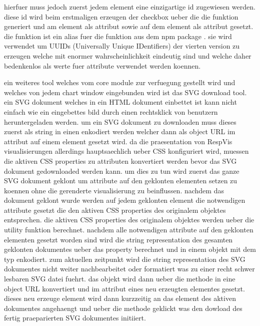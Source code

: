 hierfuer muss jedoch zuerst jedem  element eine einzigartige id zugewiesen werden.
diese id wird beim erstmaligen erzeugen der checkbox ueber die die  funktion generiert und am  element als  attribut sowie auf dem  element als  attribut gesetzt.
die  funktion ist ein alias fuer die  funktion aus dem  npm package \parencite{UUIDPackage}.
sie wird verwendet um UUIDs (Universally Unique IDentifiers) \parencite{UUIDRFC} der vierten version zu erzeugen welche mit enormer wahrscheinlichkeit eindeutig sind und welche daher bedenkenlos als werte fuer  attribute verwendet werden koennen.

ein weiteres tool welches vom core module zur verfuegung gestellt wird und welches von jedem chart window eingebunden wird ist das SVG download tool.
ein SVG dokument welches in ein HTML dokument einbettet ist kann nicht einfach wie ein eingebettes bild durch einen rechtsklick von benutzern heruntergeladen werden.
um ein SVG dokument zu downloaden muss dieses zuerst als string in einen  enkodiert werden welcher dann als object URL im  attribut auf einem  element gesetzt wird.
da die praesentation von RespVis visualisierungen allerdings hauptsaechlich ueber CSS konfiguriert wird, muessen die aktiven CSS properties zu attributen konvertiert werden bevor das SVG dokument gedownloaded werden kann.
um dies zu tun wird zuerst das ganze SVG dokument geklont um attribute auf den geklonten elementen setzen zu koennen ohne die gerenderte visualisierung zu beinflussen.
nachdem das dokument geklont wurde werden auf jedem geklonten element die notwendigen attribute gesetzt die den aktiven CSS properties des originalem objektes entsprechen.
die aktiven CSS properties des originalem objektes werden ueber die  utility funktion berechnet.
nachdem alle notwendigen attribute auf den geklonten elementen gesetzt worden sind wird die string representation des gesamten geklonten dokumentes ueber das  property berechnet und in einem  objekt mit dem typ  enkodiert.
zum aktuellen zeitpunkt wird die string representation des SVG dokumentes nicht weiter nachbearbeitet oder formatiert was zu einer recht schwer lesbaren SVG datei fuehrt.   
das  objekt wird dann ueber die  methode in eine object URL konvertiert und im  attribut eines neu erzeugten  elementes gesetzt.
dieses neu erzeuge  element wird dann kurzzeitig an das  element des aktiven dokumentes angehaengt und ueber die  methode geklickt was den dowload des fertig praeparierten SVG dokumentes initiiert.
